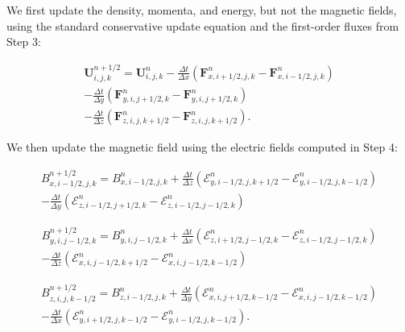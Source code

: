 \documentclass[modern]{aastex631}
\begin{document}
We first update the density, momenta, and energy, but not the magnetic fields, using the standard conservative update equation and the first-order fluxes from Step 3:

\begin{equation}
    \begin{aligned}
        \boldsymbol{U}^{n+1/2}_{i,j,k} = \boldsymbol{U}^{n}_{i,j,k}
        - \frac{\Delta t}{\Delta x} \left( \boldsymbol{F}^n_{x,i+1/2,j,k} - \boldsymbol{F}^n_{x,i-1/2,j,k} \right) \\
        - \frac{\Delta t}{\Delta y} \left( \boldsymbol{F}^n_{y,i,j+1/2,k} - \boldsymbol{F}^n_{y,i,j+1/2,k} \right) \\
        - \frac{\Delta t}{\Delta z} \left( \boldsymbol{F}^n_{z,i,j,k+1/2} - \boldsymbol{F}^n_{z,i,j,k+1/2} \right).
    \end{aligned}
\end{equation}

We then update the magnetic field using the electric fields computed in Step 4:

\begin{equation}
    \begin{aligned}
        B^{n+1/2}_{x,i-1/2,j,k} = B^{n}_{x,i-1/2,j,k}
        + \frac{\Delta t}{\Delta z} \left( \mathcal{E}^n_{y,i-1/2,j,k+1/2} - \mathcal{E}^n_{y,i-1/2,j,k-1/2} \right) \\
        - \frac{\Delta t}{\Delta y} \left( \mathcal{E}^n_{z,i-1/2,j+1/2,k} - \mathcal{E}^n_{z,i-1/2,j-1/2,k} \right)
    \end{aligned}
\end{equation}

\begin{equation}
    \begin{aligned}
        B^{n+1/2}_{y,i,j-1/2,k} = B^{n}_{y,i,j-1/2,k}
        + \frac{\Delta t}{\Delta x} \left( \mathcal{E}^n_{z,i+1/2,j-1/2,k} - \mathcal{E}^n_{z,i-1/2,j-1/2,k} \right) \\
        - \frac{\Delta t}{\Delta z} \left( \mathcal{E}^n_{x,i,j-1/2,k+1/2} - \mathcal{E}^n_{x,i,j-1/2,k-1/2} \right)
    \end{aligned}
\end{equation}

\begin{equation}
    \begin{aligned}
        B^{n+1/2}_{z,i,j,k-1/2} = B^{n}_{z,i-1/2,j,k}
        + \frac{\Delta t}{\Delta y} \left( \mathcal{E}^n_{x,i,j+1/2,k-1/2} - \mathcal{E}^n_{x,i,j-1/2,k-1/2} \right) \\
        - \frac{\Delta t}{\Delta x} \left( \mathcal{E}^n_{y,i+1/2,j,k-1/2} - \mathcal{E}^n_{y,i-1/2,j,k-1/2} \right).
    \end{aligned}
\end{equation}
\end{document}
